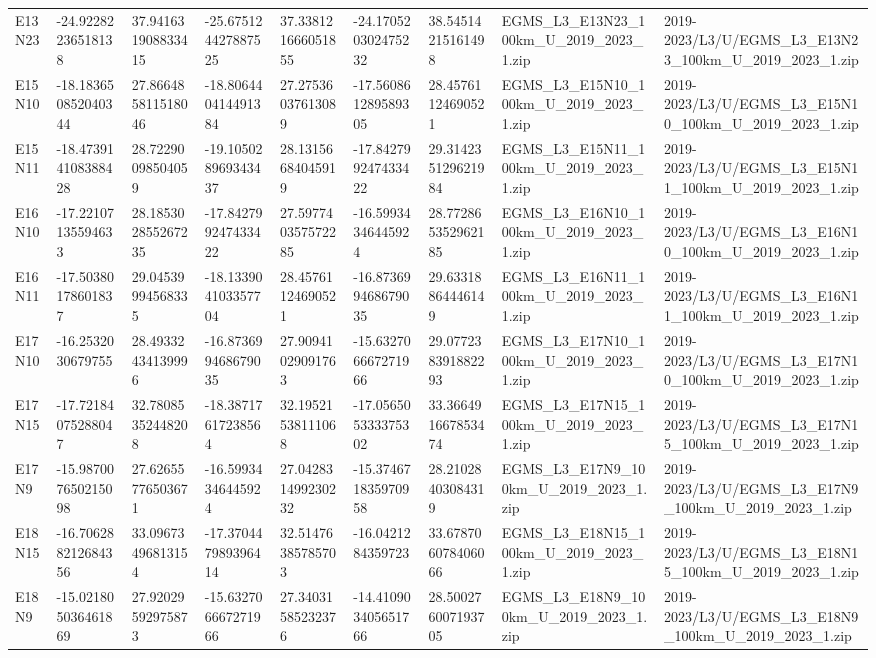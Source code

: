 \begin{landscape}
\begin{longtable}{lllllllll}
E13N23 & -24.92282236518138 & 37.941631908833415 & -25.675124427887525 & 37.338121666051855 & -24.170520302475232 & 38.54514215161498 & EGMS\_L3\_E13N23\_100km\_U\_2019\_2023\_1.zip & 2019-2023/L3/U/EGMS\_L3\_E13N23\_100km\_U\_2019\_2023\_1.zip \\
E15N10 & -18.183650852040344 & 27.866485811518046 & -18.806440414491384 & 27.27536037613089 & -17.560861289589305 & 28.45761124690521 & EGMS\_L3\_E15N10\_100km\_U\_2019\_2023\_1.zip & 2019-2023/L3/U/EGMS\_L3\_E15N10\_100km\_U\_2019\_2023\_1.zip \\
E15N11 & -18.473914108388428 & 28.72290098504059 & -19.105028969343437 & 28.13156684045919 & -17.842799247433422 & 29.314235129621984 & EGMS\_L3\_E15N11\_100km\_U\_2019\_2023\_1.zip & 2019-2023/L3/U/EGMS\_L3\_E15N11\_100km\_U\_2019\_2023\_1.zip \\
E16N10 & -17.22107135594633 & 28.185302855267235 & -17.842799247433422 & 27.597740357572285 & -16.59934346445924 & 28.772865352962185 & EGMS\_L3\_E16N10\_100km\_U\_2019\_2023\_1.zip & 2019-2023/L3/U/EGMS\_L3\_E16N10\_100km\_U\_2019\_2023\_1.zip \\
E16N11 & -17.50380178601837 & 29.04539994568335 & -18.133904103357704 & 28.45761124690521 & -16.873699468679035 & 29.63318864446149 & EGMS\_L3\_E16N11\_100km\_U\_2019\_2023\_1.zip & 2019-2023/L3/U/EGMS\_L3\_E16N11\_100km\_U\_2019\_2023\_1.zip \\
E17N10 & -16.2532030679755 & 28.49332434139996 & -16.873699468679035 & 27.90941029091763 & -15.632706667271966 & 29.077238391882293 & EGMS\_L3\_E17N10\_100km\_U\_2019\_2023\_1.zip & 2019-2023/L3/U/EGMS\_L3\_E17N10\_100km\_U\_2019\_2023\_1.zip \\
E17N15 & -17.72184075288047 & 32.78085352448208 & -18.38717617238564 & 32.19521538111068 & -17.056505333375302 & 33.366491667853474 & EGMS\_L3\_E17N15\_100km\_U\_2019\_2023\_1.zip & 2019-2023/L3/U/EGMS\_L3\_E17N15\_100km\_U\_2019\_2023\_1.zip \\
E17N9 & -15.987007650215098 & 27.62655776503671 & -16.59934346445924 & 27.042831499230232 & -15.374671835970958 & 28.21028403084319 & EGMS\_L3\_E17N9\_100km\_U\_2019\_2023\_1.zip & 2019-2023/L3/U/EGMS\_L3\_E17N9\_100km\_U\_2019\_2023\_1.zip \\
E18N15 & -16.706288212684356 & 33.09673496813154 & -17.370447989396414 & 32.51476385785703 & -16.0421284359723 & 33.678706078406066 & EGMS\_L3\_E18N15\_100km\_U\_2019\_2023\_1.zip & 2019-2023/L3/U/EGMS\_L3\_E18N15\_100km\_U\_2019\_2023\_1.zip \\
E18N9 & -15.021805036461869 & 27.92029592975873 & -15.632706667271966 & 27.34031585232376 & -14.410903405651766 & 28.500276007193705 & EGMS\_L3\_E18N9\_100km\_U\_2019\_2023\_1.zip & 2019-2023/L3/U/EGMS\_L3\_E18N9\_100km\_U\_2019\_2023\_1.zip \\

\end{longtable}
\end{landscape}
